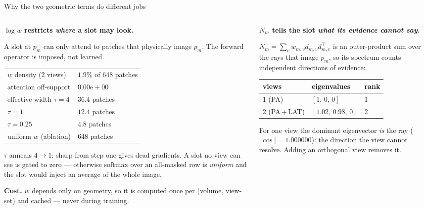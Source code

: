 \documentclass[aspectratio=169,10pt]{beamer}
\begin{document}
\begin{frame}{Why the two geometric terms do different jobs}
\footnotesize
\begin{columns}[T,onlytextwidth]
\begin{column}{0.49\textwidth}
\textbf{$\log w$ restricts \emph{where} a slot may look.}

\smallskip
A slot at $p_m$ can only attend to patches that physically image
$p_m$. The forward operator is imposed, not learned.

\smallskip
\begin{tabular}{@{}ll@{}}
$w$ density (2 views) & $1.9\%$ of $648$ patches\\
attention off-support & $0.00\mathrm{e}{+}00$\\
effective width $\tau\!=\!4$ & $36.4$ patches\\
\quad $\tau\!=\!1$ & $12.4$ patches\\
\quad $\tau\!=\!0.25$ & $4.8$ patches\\
uniform $w$ (ablation) & $648$ patches
\end{tabular}

\smallskip
$\tau$ anneals $4\!\to\!1$: sharp from step one gives dead gradients.
A slot no view can see is gated to zero --- otherwise softmax over an
all-masked row is \emph{uniform} and the slot would inject an average
of the whole image.

\medskip
\textbf{Cost.} $w$ depends only on geometry, so it is computed once
per (volume, view-set) and cached --- never during training.
\end{column}

\begin{column}{0.49\textwidth}
\textbf{$N_m$ tells the slot \emph{what its evidence cannot say}.}

\smallskip
$N_m=\sum_v w_{m,v} d_{m,v}d_{m,v}^{\!\top}$ is an outer-product sum
over the rays that image $p_m$, so its spectrum counts independent
directions of evidence:

\smallskip
\begin{tabular}{@{}lll@{}}
views & eigenvalues & rank\\
\hline
1 (PA) & $[1,\,0,\,0]$ & 1\\
2 (PA\,+\,LAT) & $[1.02,\,0.98,\,0]$ & 2\\
\end{tabular}

\smallskip
For one view the dominant eigenvector \emph{is} the ray
($|\cos|=1.000000$): the direction the view cannot resolve. Adding an
orthogonal view removes it.


\end{column}
\end{columns}
\end{frame}
\end{document}
